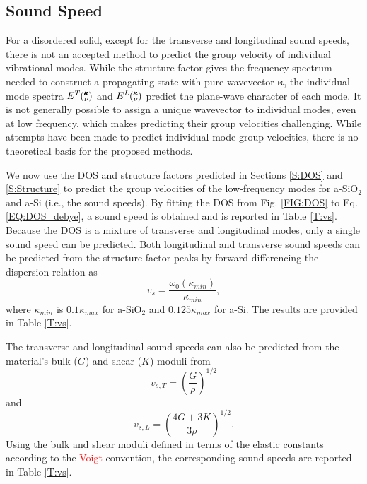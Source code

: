 \documentclass[aps,prb,twocolumn,superscriptaddress,footinbib,amsmath,amssymb,floatfix]{revtex4}
\newcommand{\kv}{\mspace{-4.0mu}\left(\mspace{-8.0mu}
\begin{smallmatrix}&\pmb{\kappa} \\&\nu\end{smallmatrix}
\mspace{-3.0mu}\right)}
\begin{document}
\subsection{\label{S:Vg}Sound Speed}

For a disordered solid,
except for the transverse and longitudinal sound speeds, there is not an
accepted method to predict the group velocity of individual 
vibrational modes.
While the structure factor gives the frequency spectrum needed to
construct a propagating state with pure wavevector $\pmb{\kappa}$,
the individual mode spectra $E^{T}\kv$ and $E^{L}\kv$ predict the
plane-wave character of each mode.
\cite{allen_diffusons_1999}
It is not generally possible
to assign a unique wavevector to individual modes, even at low frequency,
\cite{allen_diffusons_1999}
which makes predicting their group velocities challenging.
While attempts have been made to predict individual mode group velocities,
\cite{duda_reducing_2011,donadio_atomistic_2009,
he_heat_2011,hori_phonon_2013}
there is no theoretical basis for the proposed methods.

We now use the DOS and structure factors predicted in
Sections \ref{S:DOS} and \ref{S:Structure} to
predict the group velocities of the low-frequency modes for
a-SiO$_2$ and a-Si (i.e., the sound speeds). By fitting the DOS
from Fig. \ref{FIG:DOS} to Eq. \eqref{EQ:DOS_debye}, 
a sound speed is obtained and is 
reported in Table \ref{T:vs}. Because the DOS is a mixture of
transverse and longitudinal modes, only a single sound speed can be
predicted. 
Both longitudinal and transverse sound speeds can be predicted from
the structure factor peaks by forward differencing the dispersion relation as
\begin{equation}\label{EQ:vs_dwdk}
v_{s} = \frac{\omega_0(\kappa_{min})}{\kappa_{min}},
\end{equation}
where $\kappa_{min}$ is $0.1\kappa_{max}$ for a-SiO$_2$ and 
$0.125\kappa_{max}$ for a-Si. The results are provided in 
Table \ref{T:vs}.

The transverse and longitudinal sound speeds can
also be predicted from the material's bulk ($G$) and
shear ($K$) moduli from\cite{gale_general_2003} 
\begin{equation}\label{EQ:vs_T_elas}
v_{s,T} = \left(\frac{G}{\rho}\right)^{1/2}
\end{equation}
and
\begin{equation}\label{EQ:vs_L_elas}
v_{s,L} = \left(\frac{4G + 3K}{3\rho}\right)^{1/2}.
\end{equation}
Using the bulk and shear moduli defined in terms of the elastic
constants according to the \textcolor{red}{Voigt} 
convention,\cite{gale_general_2003} 
the corresponding sound speeds are reported in Table \ref{T:vs}.
 
\end{document}

